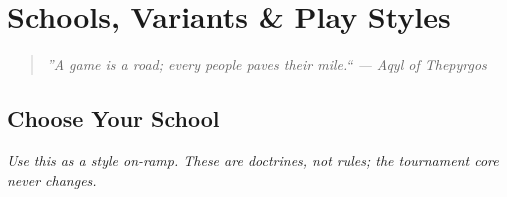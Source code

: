 \documentclass[11pt]{article}
\begin{document}
\clearpage

\section{Schools, Variants \& Play Styles}\label{sec:variants}
\begin{quote}\small\itshape
''A game is a road; every people paves their mile.`` --- Aqyl of Thepyrgos
\end{quote}


\subsection*{Choose Your School}
\noindent\textit{\color{muted}Use this as a style on-ramp. These are \emph{doctrines}, not rules; the tournament core never changes.}
\end{document}
